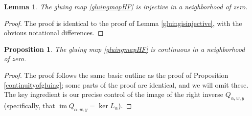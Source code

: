 \documentclass[12pt]{article}
\newtheorem{lemma}[theorem]{Lemma}
\newtheorem{proposition}[theorem]{Proposition}
\theoremstyle{definition}
\theoremstyle{remark}
\numberwithin{equation}{subsection}
\newcommand{\im}{\operatorname{im}}
\begin{document}
\begin{lemma}
The gluing map \eqref{gluingmapHF} is injective in a neighborhood of zero.
\end{lemma}

\begin{proof}
The proof is identical to the proof of Lemma \ref{gluingisinjective}, with the obvious notational differences.
\end{proof}

\begin{proposition}\label{continuityofgluingHF}
The gluing map \eqref{gluingmapHF} is continuous in a neighborhood of zero.
\end{proposition}

\begin{proof}
The proof follows the same basic outline as the proof of Proposition \ref{continuityofgluing}; some parts of the proof are identical, and we will omit these.  The key ingredient is our precise control of the image of the right inverse $Q_{\alpha,w,y}$ (specifically, that $\im Q_{\alpha,w,y}=\ker L_\alpha$).


\end{proof}
\end{document}
